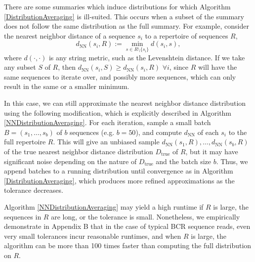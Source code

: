 \documentclass{article}
\begin{document}
There are some summaries which induce distributions for which Algorithm \ref{DistributionAveraging} is ill-suited.
This occurs when a subset of the summary does not follow the same distribution as the full summary.
For example, consider the nearest neighbor distance of a sequence $s_i$ to a repertoire of sequences $R$,
\begin{equation}
d_\text{NN}(s_i, R) := \min_{s \in R \setminus \{s_i\}} d(s_i, s),
\end{equation}
where $d(\cdot, \cdot)$ is any string metric, such as the Levenshtein distance.
If we take any subset $S$ of $R$, then $d_\text{NN}(s_i, S) \ge d_\text{NN}(s_i, R)$ $\forall i$, since $R$ will have the same sequences to iterate over, and possibly more sequences, which can only result in the same or a smaller minimum.

In this case, we can still approximate the nearest neighbor distance distribution using the following modification, which is explicitly described in Algorithm \ref{NNDistributionAveraging}.
For each iteration, sample a small batch $B = (s_1, \dotsc, s_b)$ of $b$ sequences (e.g. $b = 50$), and compute $d_\text{NN}$ of each $s_i$ to the full repertoire $R$.
This will give an unbiased sample $d_\text{NN}(s_1, R), \dotsc, d_\text{NN}(s_b, R)$ of the true nearest neighbor distance distribution $D_\text{true}$ of $R$, but it may have significant noise depending on the nature of $D_\text{true}$ and the batch size $b$.
Thus, we append batches to a running distribution until convergence as in Algorithm \ref{DistributionAveraging}, which produces more refined approximations as the tolerance decreases.

Algorithm \ref{NNDistributionAveraging} may yield a high runtime if $R$ is large, the sequences in $R$ are long, or the tolerance is small.
Nonetheless, we empirically demonstrate in Appendix B that in the case of typical BCR sequence reads, even very small tolerances incur reasonable runtimes, and when $R$ is large, the algorithm can be more than 100 times faster than computing the full distribution on $R$.
\end{document}
